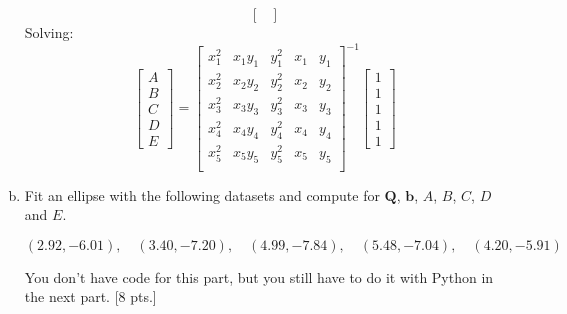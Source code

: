 \begin{enumerate}[a.)]
\[\begin{bmatrix}
\end{bmatrix}
\]
Solving:
\[
\begin{bmatrix}
A \\ B \\ C \\ D \\ E
\end{bmatrix}
=
\begin{bmatrix}
x_1^2 & x_1 y_1 & y_1^2 & x_1 & y_1 \\
x_2^2 & x_2 y_2 & y_2^2 & x_2 & y_2 \\
x_3^2 & x_3 y_3 & y_3^2 & x_3 & y_3 \\
x_4^2 & x_4 y_4 & y_4^2 & x_4 & y_4 \\
x_5^2 & x_5 y_5 & y_5^2 & x_5 & y_5 \\
\end{bmatrix}^{-1}
\begin{bmatrix}
1 \\ 1 \\ 1 \\ 1 \\ 1
\end{bmatrix}
\]
\item 
Fit an ellipse with the following datasets and compute for $\mathbf{Q}$, $\mathbf{b}$, $A$, $B$, $C$, $D$ and $E$.

\begin{equation*}
    (2.92, -6.01), \quad (3.40, -7.20), \quad (4.99, -7.84), \quad (5.48, -7.04), \quad (4.20, -5.91)
\end{equation*}

 You don't have code for this part, but you still have to do it with Python in the next part. [8 pts.]
\end{enumerate}

